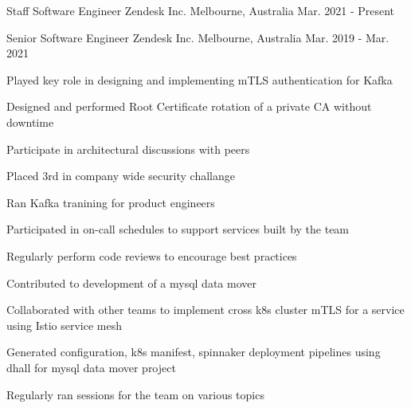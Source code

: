

\begin{cventries}

  \cventry
    {Staff Software Engineer} %
    {Zendesk Inc.} %
    {Melbourne, Australia} %
    {Mar. 2021 - Present} %
    {
      \begin{cvitems} %
      \end{cvitems}
    }

  \cventry
    {Senior Software Engineer} %
    {Zendesk Inc.} %
    {Melbourne, Australia} %
    {Mar. 2019 - Mar. 2021} %
    {
      \begin{cvitems} %
        \item {Played key role in designing and implementing mTLS authentication for Kafka}
        \item {Designed and performed Root Certificate rotation of a private CA without downtime}
        \item {Participate in architectural discussions with peers}
        \item {Placed 3rd in company wide security challange}
        \item {Ran Kafka tranining for product engineers}
        \item {Participated in on-call schedules to support services built by the team}
        \item {Regularly perform code reviews to encourage best practices}
        \item {Contributed to development of a mysql data mover}
        \item {Collaborated with other teams to implement cross k8s cluster mTLS for a service using Istio service mesh}
        \item {Generated configuration, k8s manifest, spinnaker deployment pipelines using dhall for mysql data mover project}
        \item {Regularly ran sessions for the team on various topics}
      \end{cvitems}
    }


\end{cventries}
